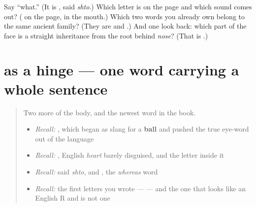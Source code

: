 \begin{tcolorbox}[breakable,colback=teal!4,colframe=teal!35!black,title={Before you move on}]
Say \textquotedblleft{}what.\textquotedblright{} (It is \textbf{}, said \emph{shto}.) Which letter is on the page and which sound comes out? (\textbf{} on the page, \textbf{} in the mouth.) Which two words you already own belong to the same ancient family? (They are \textbf{} and \textbf{}.) And one look back: which part of the face is a straight inheritance from the root behind \emph{nose}? (That is \textbf{}.)
\end{tcolorbox}
\section[\texorpdfstring{…, \ru{что} … (…, shto …)}{…, что … (…, shto …)}]{ as a hinge — one word carrying a whole sentence}

\label{lesson:RU-C18-chto-soyuz}



\begin{quote}
Two more of the body, and the newest word in the book.

\begin{itemize}
\raggedright
  \item \emph{Recall:} \emph{}, which began as slang for a \textbf{ball} and pushed the true eye-word out of the language
  \item \emph{Recall:} \emph{}, English \emph{heart} barely disguised, and the letter \textbf{} inside it
  \item \emph{Recall:} \emph{} said \emph{shto}, and \emph{}, the \emph{whereas} word
  \item \emph{Recall:} the first letters you wrote — \textbf{      } — and the one that looks like an English R and is not one
\end{itemize}
\end{quote}

